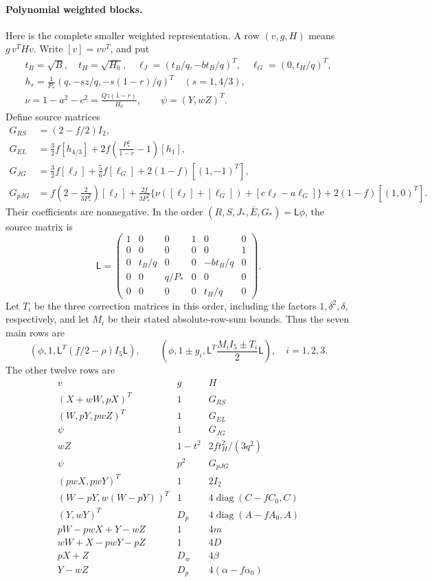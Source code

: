 \paragraph{Polynomial weighted blocks.}
Here is the complete smaller weighted representation. A row
$(v,g,H)$ means $g\,v^THv$. Write $[v]=vv^T$, and put
\begin{gather*}
 t_B=\sqrt B,\quad t_H=\sqrt{H_0},\quad
 \ell_J=(t_B/q,-bt_B/q)^T,\quad \ell_G=(0,t_H/q)^T,\\
 h_s=\frac1{P_*}(q,-sz/q,-s(1-r)/q)^T\quad(s=1,4/3),\\
 \nu=1-a^2-c^2=\frac{Qz(1-r)}{H_0},\qquad \psi=(Y,wZ)^T.
\end{gather*}
Define source matrices
\begin{align*}
 G_{RS}&=(2-f/2)I_2,\\
 G_{EL}&=\tfrac32f[h_{4/3}]
               +2f\left(\frac{P_*^2}{1-r}-1\right)[h_1],\\
 G_{JG}&=\tfrac32f[\ell_J]+\tfrac56f[\ell_G]
                                      +2(1-f)[(1,-1)^T],\\
 G_{pJG}&=f\left(2-\frac2{3P_*^2}\right)[\ell_J]
       +\frac{2f}{3P_*^2}\{\nu([\ell_J]+[\ell_G])
                                      +[c\ell_J-a\ell_G]\}
       +2(1-f)[(1,0)^T].
\end{align*}
Their coefficients are nonnegative. In the order
$(R,S,J_*,\bar E,G_*)=\mathsf L\phi$, the source matrix is
\[
 \mathsf L=\begin{pmatrix}
 1&0&0&1&0&0\\0&0&0&0&0&1\\
 0&t_B/q&0&0&-bt_B/q&0\\
 0&0&q/P_*&0&0&0\\0&0&0&0&t_H/q&0
 \end{pmatrix}.
\]
Let $T_i$ be the three correction matrices in this order, including
the factors $1,\delta^2,\delta$, respectively, and let $M_i$
be their stated absolute-row-sum bounds. Thus the seven main rows are
\[
 \left(\phi,1,\mathsf L^T(f/2-\rho)I_5\mathsf L\right),\qquad
 \left(\phi,1\pm y_i,
              \mathsf L^T\frac{M_iI_5\pm T_i}{2}\mathsf L\right),
 \quad i=1,2,3.
\]
The other twelve rows are
\[
\begin{array}{c|c|c}
 v&g&H\\\hline
 (X+wW,pX)^T&1&G_{RS}\\
 (W,pY,pwZ)^T&1&G_{EL}\\
 \psi&1&G_{JG}\\
 wZ&1-t^2&2ft_H^2/(3q^2)\\
 \psi&p^2&G_{pJG}\\
 (pwX,pwY)^T&1&2I_2\\
 (W-pY,w(W-pY))^T&1&4\operatorname{diag}(C-fC_0,C)\\
 (Y,wY)^T&D_p&4\operatorname{diag}(A-fA_0,A)\\
 pW-pwX+Y-wZ&1&4m\\
 wW+X-pwY-pZ&1&4D\\
 pX+Z&D_w&4\beta\\
 Y-wZ&D_p&4(\alpha-f\alpha_0)
\end{array}
\]
